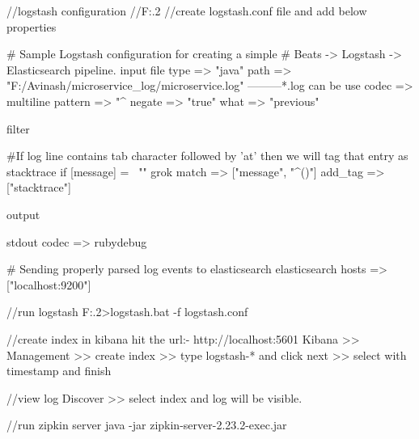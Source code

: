 //logstash configuration
//F:\Avinash\Microservice\ELK{}.2\bin
//create logstash.conf file and add below properties

# Sample Logstash configuration for creating a simple
# Beats -> Logstash -> Elasticsearch pipeline.
input {
  file {
    type => "java"
    path => "F:/Avinash/microservice_log/microservice.log"  ---------*.log can be use
    codec => multiline {
      pattern => "^%
      negate => "true"
      what => "previous"
    }
  }
}

filter {
  #If log line contains tab character followed by 'at' then we will tag that entry as stacktrace
  if [message] =~ "\tat" {
    grok {
      match => ["message", "^(\tat)"]
      add_tag => ["stacktrace"]
    }
  }

}

output {

  stdout {
    codec => rubydebug
  }

  # Sending properly parsed log events to elasticsearch
  elasticsearch {
    hosts => ["localhost:9200"]
  }
}


//run logstash
F:\Avinash\Microservice\ELK{}.2\bin>logstash.bat -f logstash.conf

//create index in kibana hit the url:- http://localhost:5601
Kibana >> Management >> create index >> type logstash-* and click next >> select with timestamp and finish

//view log
Discover >> select index and log will be visible.


//run zipkin server
java -jar zipkin-server-2.23.2-exec.jar